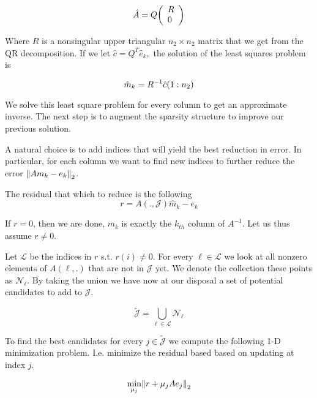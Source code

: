 \documentclass[paper=A4, fontsize=11pt]{scrartcl}
\let\originalleft\left
\let\originalright\right
\renewcommand{\left}{\mathopen{}\mathclose\bgroup\originalleft}
\renewcommand{\right}{\aftergroup\egroup\originalright}
\theoremstyle{remark}
\begin{document}
\begin{equation}
\hat{A}=Q\left(\begin{array}{l}{R} \\ {0}\end{array}\right)
\end{equation}

Where \(R\) is a nonsingular upper triangular \(n_{2} \times n_{2}\) matrix that we get from the QR decomposition. If we let \(\hat{c}=Q^{T} \hat{e}_{k},\) the
solution of the least squares problem is

\begin{equation}
\hat{m}_{k}=R^{-1} \hat{c}\left(1 : n_{2}\right)
\end{equation}


We solve this least square problem for every column to get an approximate inverse. The next step is to augment the sparsity structure to improve our previous solution.


A natural choice is to add indices that will yield the best reduction in error.
In particular, for each column we want to find new indices to further reduce the error \(\left\|A m_{k}-e_{k}\right\|_{2}\).


The residual that which to reduce is the following
\begin{equation}
r=A( ., \mathcal{J}) \hat{m}_{k}-e_{k}
\end{equation}


If $r = 0$, then we are done, $m_{k}$ is exactly the $k_{th}$ column of $A^{-1}$. Let us thus assume $r \neq 0$. 


Let $\mathcal{L}$ be the indices in $r$ s.t. $r(i) \neq 0$. For every $ \ell \in \mathcal{L} $ we look at all nonzero elements of $A(\ell,.)$ that are not in $\mathcal{J}$ yet. We denote the collection these points as \(\mathcal{N}_{\ell}\). By taking the union we have now at our disposal a set of potential candidates to add to $\mathcal{J}$.


\begin{equation}
\tilde{\mathcal{J}}=\bigcup_{\ell \in \mathcal{L}} \mathcal{N}_{\ell}
\end{equation}

To find the best candidates for every \(j \in \tilde{\mathcal{J}}\) we compute the following 1-D minimization problem. I.e. minimize the residual based based on updating at index $j$.

\begin{equation}
\min _{\mu_{j}}\left\|r+\mu_{j} A e_{j}\right\|_{2}
\end{equation}
\end{document}
